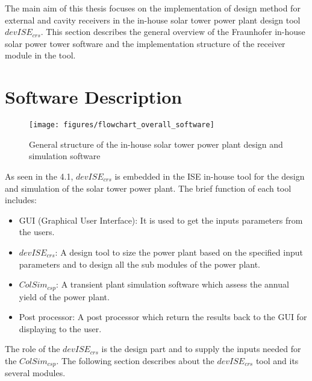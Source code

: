 The main aim of this thesis focuses on the implementation of design method for external and cavity receivers in the in-house solar tower power plant design tool $devISE_{crs}$. This section describes the general overview of the Fraunhofer in-house solar power tower software and the implementation structure of the receiver module in the tool.
\section{Software Description}
\begin{figure}[h!]
	\texttt{[image: figures/flowchart\_overall\_software]}
	\centering
	\caption{General structure of the in-house solar tower power plant design and simulation software}	
\end{figure}
As seen in the \figurename{ 4.1}, $devISE_{crs}$ is embedded in the ISE in-house tool for the design and simulation of the solar tower power plant. The brief function of each tool includes:
\begin{itemize}
	\item GUI (Graphical User Interface): It is used to get the inputs parameters from the users.
	\item $devISE_{crs}$: A design tool to size the power plant based on the specified input parameters and to design all the sub modules of the power plant.
	\item $ColSim_{csp}$: A transient plant simulation software which assess the annual yield of the power plant.
	\item Post processor: A post processor which return the results back to the GUI for displaying to the user. 
\end{itemize}
The role of the $devISE_{crs}$ is the design part and to supply the inputs needed for the $ColSim_{csp}$. The following section describes about the $devISE_{crs}$ tool and its several modules.

